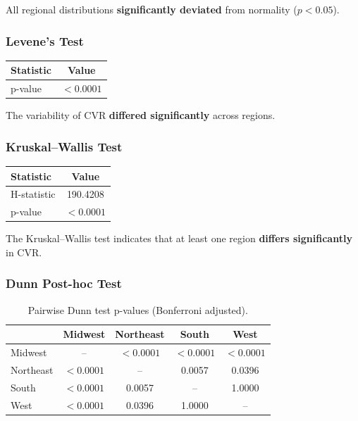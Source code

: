 All regional distributions\textbf{ significantly deviated} from normality ($p<0.05$).

\vspace{0.3cm}

\subsubsection{Levene's Test}

\begin{table}[H]
	\centering
	\begin{tabular}{lc}
		\toprule
		Statistic & Value \\
		\midrule
		p-value & $<0.0001$ \\
		\bottomrule
	\end{tabular}
\end{table}

The variability of CVR \textbf{differed significantly} across regions.

\vspace{0.3cm}

\subsubsection{Kruskal--Wallis Test}

\begin{table}[H]
	\centering
	\begin{tabular}{lc}
		\toprule
		Statistic & Value \\
		\midrule
		H-statistic & 190.4208 \\
		p-value & $<0.0001$ \\
		\bottomrule
	\end{tabular}
\end{table}

The Kruskal--Wallis test indicates that at least one region\textbf{ differs significantly} in CVR.

\vspace{0.3cm}

\subsubsection{Dunn Post-hoc Test}

\begin{table}[H]
	\centering
	\caption{Pairwise Dunn test p-values (Bonferroni adjusted).}
	\begin{tabular}{lcccc}
		\toprule
		& Midwest & Northeast & South & West \\
		\midrule
		Midwest & -- & $<0.0001$ & $<0.0001$ & $<0.0001$ \\
		Northeast & $<0.0001$ & -- & 0.0057 & 0.0396 \\
		South & $<0.0001$ & 0.0057 & -- & 1.0000 \\
		West & $<0.0001$ & 0.0396 & 1.0000 & -- \\
		\bottomrule
	\end{tabular}
\end{table}

